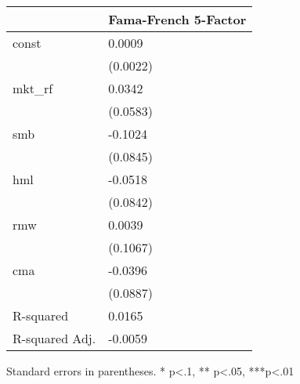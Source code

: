 \begin{table}
\caption{}
\label{}
\begin{center}
\begin{tabular}{ll}
\hline
               & Fama-French 5-Factor  \\
\hline
const          & 0.0009                \\
               & (0.0022)              \\
mkt\_rf        & 0.0342                \\
               & (0.0583)              \\
smb            & -0.1024               \\
               & (0.0845)              \\
hml            & -0.0518               \\
               & (0.0842)              \\
rmw            & 0.0039                \\
               & (0.1067)              \\
cma            & -0.0396               \\
               & (0.0887)              \\
R-squared      & 0.0165                \\
R-squared Adj. & -0.0059               \\
\hline
\end{tabular}
\end{center}
\end{table}
\bigskip
Standard errors in parentheses. \newline 
* p<.1, ** p<.05, ***p<.01